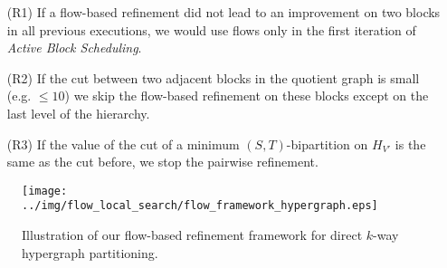 \begin{enumerate}
\item[(R1)] If a flow-based refinement did not lead to an improvement on two blocks in all previous
            executions, we would use flows only in the first iteration of 
            \emph{Active Block Scheduling}.
\item[(R2)] If the cut between two adjacent blocks in the quotient graph is small (e.g. $\le 10$) we
            skip the flow-based refinement on these blocks except on the last level of the hierarchy.
\item[(R3)] If the value of the cut of a minimum $(S,T)$-bipartition on $H_{V'}$ is the same 
            as the cut before, we stop the pairwise refinement.
\end{enumerate}

\begin{figure}
\centering 
\texttt{[image: ../img/flow\_local\_search/flow\_framework\_hypergraph.eps]}
\caption{Illustration of our flow-based refinement framework for direct $k$-way hypergraph
         partitioning.}
\label{img:flow_framework}
\end{figure} 